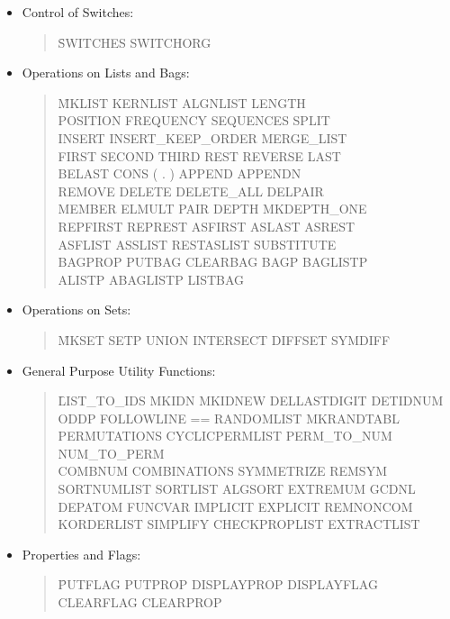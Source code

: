 \begin{itemize}
\item{Control of Switches:}
\begin{quotation}
\noindent
\f{SWITCHES SWITCHORG}
\end{quotation}
\item{Operations on Lists and Bags:}
\begin{quotation}
\noindent
\f{MKLIST KERNLIST ALGNLIST LENGTH \\
POSITION FREQUENCY SEQUENCES SPLIT \\
INSERT INSERT\_KEEP\_ORDER MERGE\_LIST \\
FIRST SECOND THIRD REST REVERSE LAST \\
BELAST CONS ( . ) APPEND APPENDN \\
REMOVE DELETE DELETE\_ALL DELPAIR \\
MEMBER ELMULT PAIR DEPTH MKDEPTH\_ONE \\
REPFIRST REPREST ASFIRST ASLAST ASREST \\
ASFLIST ASSLIST RESTASLIST SUBSTITUTE \\
BAGPROP PUTBAG CLEARBAG BAGP BAGLISTP \\
ALISTP ABAGLISTP LISTBAG }
\end{quotation}
\item{Operations on Sets:}
\begin{quotation}
\noindent
\f{MKSET SETP UNION INTERSECT DIFFSET SYMDIFF}
\end{quotation}
\item{General Purpose Utility Functions:}
\begin{quotation}
\noindent
\f{LIST\_TO\_IDS MKIDN MKIDNEW DELLASTDIGIT DETIDNUM \\
ODDP FOLLOWLINE  == RANDOMLIST MKRANDTABL \\
PERMUTATIONS CYCLICPERMLIST PERM\_TO\_NUM NUM\_TO\_PERM\\ 
COMBNUM COMBINATIONS SYMMETRIZE REMSYM \\
SORTNUMLIST SORTLIST ALGSORT EXTREMUM GCDNL\\
DEPATOM FUNCVAR IMPLICIT EXPLICIT REMNONCOM \\
KORDERLIST SIMPLIFY CHECKPROPLIST EXTRACTLIST} 
\end{quotation}
\item{ Properties and Flags:}
\begin{quotation}
\noindent
\f{PUTFLAG PUTPROP DISPLAYPROP DISPLAYFLAG \\
CLEARFLAG CLEARPROP }
\end{quotation}

\end{itemize}
